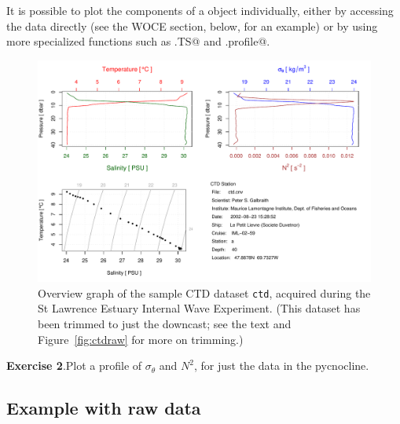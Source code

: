 \documentclass{article}
\newcommand{\workedexercise}[2]{
	\vspace{2ex plus 2ex minus 1ex}
	\begin{boxedminipage}[c]{0.95\linewidth}
		{\textbf{Exercise #1}.\hspace{1em}#2}
	\end{boxedminipage}
	\vspace{2ex plus 2ex minus 1ex}
}
\begin{document}
It is possible to plot the components of a \verb@ctd@ object individually,
either by accessing the data directly (see the WOCE section, below, for an
example) or by using more specialized functions such as
\verb@plot.TS@ and \verb@plot.profile@.
\begin{figure}
\begin{center}
\includegraphics{oce-ctdfig}
\end{center}
\caption{Overview graph of the sample CTD dataset \texttt{ctd}, acquired during
the St Lawrence Estuary Internal Wave Experiment.  (This dataset has been
trimmed to just the downcast; see the text and Figure~\ref{fig:ctdraw} for more
on trimming.)}
\label{fig:ctd}
\end{figure}

\workedexercise{2}{Plot a profile of $\sigma_\theta$ and $N^2$, for just the data in the pycnocline.}

\subsection{Example with raw data}
\end{document}
